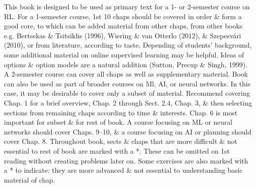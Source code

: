 \documentclass{article}
\begin{document}
\begin{itemize}
    This book is designed to be used as primary text for a 1- or 2-semester course on RL. For a 1-semester course, 1st 10 chaps should be covered in order \& form a good core, to which can be added material from other chaps, from other books e.g. Bertsekas \& Tsitsiklis (1996), Wiering \& van Otterlo (2012), \& Szepesvári (2010), or from literature, according to taste. Depending of students' background, some additional material on online supervised learning may be helpful. Ideas of options \& option models are a natural addition (Sutton, Precup \& Singh, 1999). A 2-semester course can cover all chaps as well as supplementary material. Book can also be used as part of broader courses on Ml, AI, or neural networks. In this case, it may be desirable to cover only a subset of material. Recommend covering Chap. 1 for a brief overview, Chap. 2 through Sect. 2.4, Chap. 3, \& then selecting sections from remaining chaps according to time \& interests. Chap. 6 is most important for subset \& for rest of book. A course focusing on ML or neural networks should cover Chaps. 9--10,  \& a course focusing on AI or planning should cover Chap. 8. Throughout book, sects \& chaps that are more difficult \& not essential to rest of book are marked with a *. These can be omitted on 1st reading without creating problems later on. Some exercises are also marked with a * to indicate: they are more advanced \& not essential to understanding basic material of chap.


\end{itemize}
\end{document}
